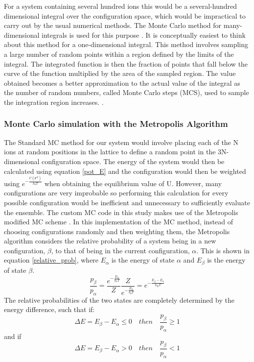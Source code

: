 \documentclass[11pt, twoside]{report}
\begin{document}
For a system containing several hundred ions this would be a several-hundred dimensional integral over the configuration space, which would be impractical to carry out by the usual numerical methods. The Monte Carlo method for many-dimensional integrals is used for this purpose \cite{Metropolis}. It is conceptually easiest to think about this method for a one-dimensional integral. This method involves sampling a large number of random points within a region defined by the limits of the integral. The integrated function is then the fraction of points that fall below the curve of the function multiplied by the area of the sampled region. The value obtained becomes a better approximation to the actual value of the integral as the number of random numbers, called Monte Carlo steps (MCS), used to sample the integration region increases. \cite{Lesar3}.


\subsubsection{Monte Carlo simulation with the Metropolis Algorithm }
The Standard MC method for our system would involve placing each of the N ions at random positions in the lattice to define a random point in the 3N-dimensional configuration space. The energy of the system would then be calculated using equation \ref{pot_E} and the configuration would then be weighted using $e^{-\frac{U(\mathbf{r}^N)}{k_bT}}$ when obtaining the equilibrium value of U. However, many configurations are very improbable so performing this calculation for every possible configuration would be inefficient and unnecessary to sufficiently evaluate the ensemble. The custom MC code in this study makes use of the Metropolis modified MC scheme \cite{Metropolis}. In this implementation of the MC method, instead of choosing configurations randomly and then weighting them, the Metropolis algorithm considers the relative probability of a system being in a new configuration, $\beta$, to that of being in the current configuration, $\alpha$. This is shown in equation \ref{relative_prob}, where $E_\alpha$ is the energy of state $\alpha$ and $E_\beta$ is the energy of state $\beta$.
\begin{equation}\label{relative_prob}
\frac{p_\beta}{p_\alpha} = \frac{  e^{-\frac{E_\alpha}{k_bT}} }{Z} \frac{Z}{  e^{-\frac{E_\alpha}{k_bT}} } = e^{- \frac{E_\beta - E_\alpha}{k_BT}}
\end{equation}
The relative probabilities of the two states are completely determined by the energy 
difference, such that if:
\begin{equation}\label{met}
\Delta E = E_{\beta} - E_{\alpha} \leq 0    \quad  then  \quad   \frac{p_{\beta}}{p_{\alpha}} \geq 1 
\end{equation}
and if
\begin{equation}\label{met2}
\Delta E = E_{\beta} - E_{\alpha} > 0   \quad   then   \quad   \frac{p_{\beta}}{p_{\alpha}} < 1
\end{equation}
\end{document}
